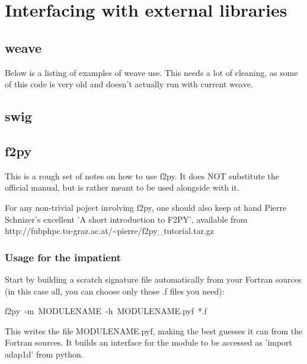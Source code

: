 
\chapter[External libraries]{Interfacing with external libraries}


\section{weave}


Below is a listing of examples of weave use. This needs a lot of cleaning,
as some of this code is very old and doesn't actually run with current
weave. 




\section{swig }


\section{f2py }

This is a rough set of notes on how to use f2py. It does NOT substitute
the official manual, but is rather meant to be used alongside with
it. 

For any non-trivial poject involving f2py, one should also keep at
hand Pierre Schnizer's excellent 'A short introduction to F2PY', available
from http://fubphpc.tu-graz.ac.at/\textasciitilde{}pierre/f2py\_tutorial.tar.gz 


\subsection{Usage for the impatient }

Start by building a scratch signature file automatically from your
Fortran sources (in this case all, you can choose only those .f files
you need): 

\begin{lyxcode}
f2py~-m~MODULENAME~-h~MODULENAME.pyf~{*}.f~
\end{lyxcode}
This writes the file MODULENAME.pyf, making the best guesses it can
from the Fortran sources. It builds an interface for the module to
be accessed as 'import adap1d' from python.

